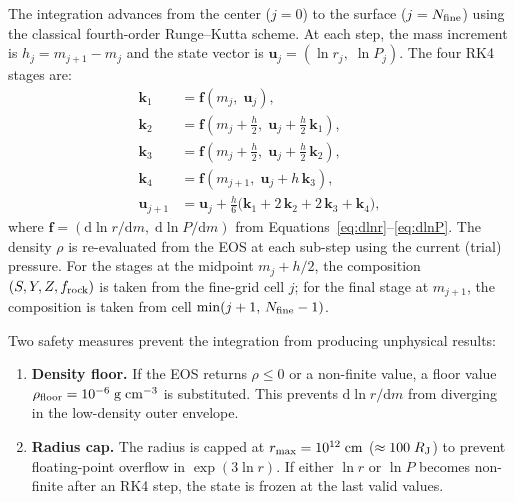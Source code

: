 \documentclass{aastex631}
\newcommand{\dd}{\mathrm{d}}
\begin{document}
The integration advances from the center ($j=0$) to the surface
($j = N_{\rm fine}$) using the classical fourth-order Runge--Kutta
scheme.  At each step, the mass increment is $h_j = m_{j+1} - m_j$ and
the state vector is $\mathbf{u}_j = (\ln r_j,\;\ln P_j)$.  The four
RK4 stages are:
\begin{equation}\label{eq:rk4_stages}
\begin{aligned}
  \mathbf{k}_1 &= \mathbf{f}(m_j,\;\mathbf{u}_j), \\
  \mathbf{k}_2 &= \mathbf{f}\!\left(m_j + \tfrac{h}{2},\;
    \mathbf{u}_j + \tfrac{h}{2}\,\mathbf{k}_1\right), \\
  \mathbf{k}_3 &= \mathbf{f}\!\left(m_j + \tfrac{h}{2},\;
    \mathbf{u}_j + \tfrac{h}{2}\,\mathbf{k}_2\right), \\
  \mathbf{k}_4 &= \mathbf{f}\!\left(m_{j+1},\;
    \mathbf{u}_j + h\,\mathbf{k}_3\right), \\
  \mathbf{u}_{j+1} &= \mathbf{u}_j + \frac{h}{6}\bigl(
    \mathbf{k}_1 + 2\,\mathbf{k}_2 + 2\,\mathbf{k}_3
    + \mathbf{k}_4\bigr),
\end{aligned}
\end{equation}
where $\mathbf{f} = (\dd\ln r/\dd m,\;\dd\ln P/\dd m)$ from
Equations~\eqref{eq:dlnr}--\eqref{eq:dlnP}.  The density $\rho$ is
re-evaluated from the EOS at each sub-step using the current (trial)
pressure.  For the stages at the midpoint $m_j + h/2$, the composition
$(S, Y, Z, f_{\rm rock})$ is taken from the fine-grid cell $j$; for the
final stage at $m_{j+1}$, the composition is taken from cell
$\min(j+1,\,N_{\rm fine}-1)$.

Two safety measures prevent the integration from producing unphysical
results:
\begin{enumerate}
  \item \textbf{Density floor.}  If the EOS returns $\rho \leq 0$ or a
    non-finite value, a floor value $\rho_{\rm floor} = 10^{-6}\;\mathrm
    {g\;cm^{-3}}$ is substituted.  This prevents $\dd\ln r/\dd m$ from
    diverging in the low-density outer envelope.
  \item \textbf{Radius cap.}  The radius is capped at $r_{\rm max} =
    10^{12}\;\mathrm{cm}$ ($\approx 100\;R_{\rm J}$) to prevent
    floating-point overflow in $\exp(3\ln r)$.  If either $\ln r$ or
    $\ln P$ becomes non-finite after an RK4 step, the state is frozen at
    the last valid values.
\end{enumerate}

\end{document}
